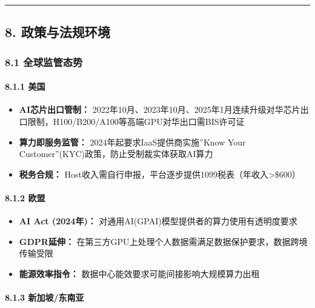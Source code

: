 \documentclass[UTF8,a4paper,12pt]{ctexart}
\begin{document}
\begin{center}\rule{0.5\linewidth}{0.5pt}\end{center}

\pagebreak

\subsection{8.
政策与法规环境}\label{ux653fux7b56ux4e0eux6cd5ux89c4ux73afux5883}

\subsubsection{8.1
全球监管态势}\label{ux5168ux7403ux76d1ux7ba1ux6001ux52bf}

\paragraph{8.1.1 美国}\label{ux7f8eux56fd}

\begin{itemize}
\tightlist
\item
  \textbf{AI芯片出口管制：}
  2022年10月、2023年10月、2025年1月连续升级对华芯片出口限制，H100/B200/A100等高端GPU对华出口需BIS许可证
\item
  \textbf{算力即服务监管：} 2024年起要求IaaS提供商实施''Know Your
  Customer''(KYC)政策，防止受制裁实体获取AI算力
\item
  \textbf{税务合规：}
  Host收入需自行申报，平台逐步提供1099税表（年收入\textgreater\$600）
\end{itemize}

\paragraph{8.1.2 欧盟}\label{ux6b27ux76df}

\begin{itemize}
\tightlist
\item
  \textbf{AI Act (2024年)：}
  对通用AI(GPAI)模型提供者的算力使用有透明度要求
\item
  \textbf{GDPR延伸：}
  在第三方GPU上处理个人数据需满足数据保护要求，数据跨境传输受限
\item
  \textbf{能源效率指令：} 数据中心能效要求可能间接影响大规模算力出租
\end{itemize}

\paragraph{8.1.3
新加坡/东南亚}\label{ux65b0ux52a0ux5761ux4e1cux5357ux4e9a}
\end{document}
